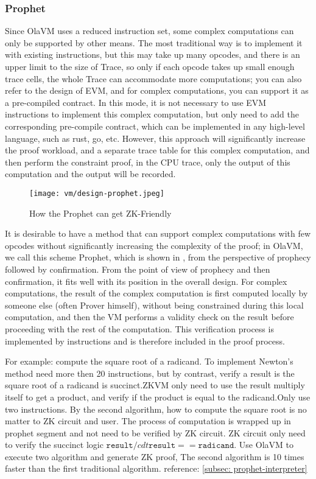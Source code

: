 \subsubsection{Prophet} \label{sec:design-prophet}

Since OlaVM uses a reduced instruction set, some complex computations can only be supported by other means. The most
traditional way is to implement it with existing instructions, but this may take up many opcodes, and there is an upper
limit to the size of Trace, so only if each opcode takes up small enough trace cells, the whole Trace can accommodate more
computations; you can also refer to the design of EVM, and for complex computations, you can support it as a pre-compiled
contract. In this mode, it is not necessary to use EVM instructions to implement this complex computation, but only need
to add the corresponding pre-compile contract, which can be implemented in any high-level language, such as rust, go, etc.
However, this approach will significantly increase the proof workload, and a separate trace table for this complex computation,
and then perform the constraint proof, in the CPU trace, only the output of this computation and the output will be recorded.

\begin{figure}[!ht]
    \centering
    \texttt{[image: vm/design-prophet.jpeg]}
    \caption{How the Prophet can get ZK-Friendly}
    \label{fig:desgin-prophet}
\end{figure}

It is desirable to have a method that can support complex computations with few opcodes without significantly increasing the
complexity of the proof; in OlaVM, we call this scheme Prophet, which is shown in , from the perspective
of prophecy followed by confirmation. From the point of view of prophecy and then confirmation, it fits well with its position
in the overall design. For complex computations, the result of the complex computation is first computed locally by someone else
(often Prover himself), without being constrained during this local computation, and then the VM performs a validity check on the
result before proceeding with the rest of the computation. This verification process is implemented by instructions and is therefore
included in the proof process.

For example: compute the square root of a radicand. To implement Newton's method need more then 20 instructions, but by contrast, 
verify a result is the square root of a radicand is succinct.ZKVM only need to use the result multiply itself to get a product, 
and verify if the product is equal to the radicand.Only use two instructions. By the second algorithm, how to compute the square 
root is no matter to ZK circuit and user. The process of computation is wrapped up in prophet segment and not need to be verified 
by ZK circuit. ZK circuit only need to verify the succinct logic $\texttt{result} /cdt \texttt{result} == \texttt{radicand}$.
Use OlaVM to execute two algorithm and generate ZK proof, The second algorithm is 10 times faster than the first traditional algorithm.
reference: \ref{subsec: prophet-interpreter}


